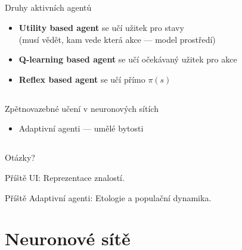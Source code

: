 \documentclass{beamer}
\begin{document}
\subsection{}
\begin{frame}{Druhy aktivních agentů}
\begin{itemize}
\item {\bf Utility based agent} se učí užitek pro stavy \\ (musí vědět, kam vede která akce --- model prostředí)
\item {\bf Q-learning based agent} se učí očekávaný užitek pro akce
\item {\bf Reflex based agent} se učí přímo $\pi(s)$
\end{itemize}
\end{frame}

\subsection{}
\begin{frame}{Zpětnovazebné učení v neuronových sítích}
\begin{itemize}
\item Adaptivní agenti --- umělé bytosti
\end{itemize}
\end{frame}

\subsection{}
\begin{frame}{Otázky?}
\begin{center}
Příště UI: Reprezentace znalostí.

Příště Adaptivní agenti: Etologie a populační dynamika.
\end{center}
\end{frame}

\section{Neuronové sítě}
\end{document}
